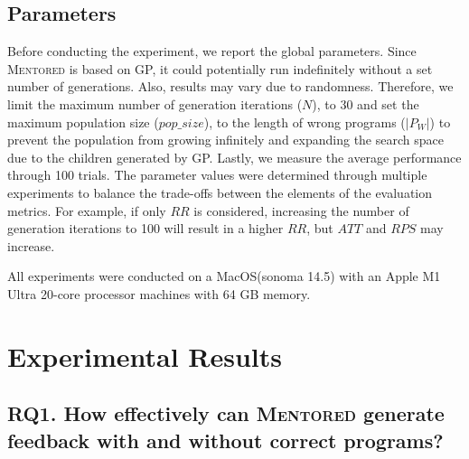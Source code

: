 \documentclass[10pt,conference]{IEEEtran}
\begin{document}
    \subsection{Parameters}
        Before conducting the experiment, we report the global parameters. Since \textsc{Mentored} is based on GP, it could potentially run indefinitely without a set number of generations. Also, results may vary due to randomness. Therefore, we limit the maximum number of generation iterations ($N$), to 30 and set the maximum population size ($pop\_size$), to the length of wrong programs ($|P_{W}|$) to prevent the population from growing infinitely and expanding the search space due to the children generated by GP. Lastly, we measure the average performance through 100 trials. The parameter values were determined through multiple experiments to balance the trade-offs between the elements of the evaluation metrics. For example, if only $RR$ is considered, increasing the number of generation iterations to 100 will result in a higher $RR$, but $ATT$ and $RPS$ may increase.

    All experiments were conducted on a MacOS(sonoma 14.5) with an Apple M1 Ultra 20-core processor machines with 64 GB memory.



\section{Experimental Results}

    \subsection{RQ1. How effectively can \textsc{Mentored} generate feedback with and without correct programs?}
\end{document}
